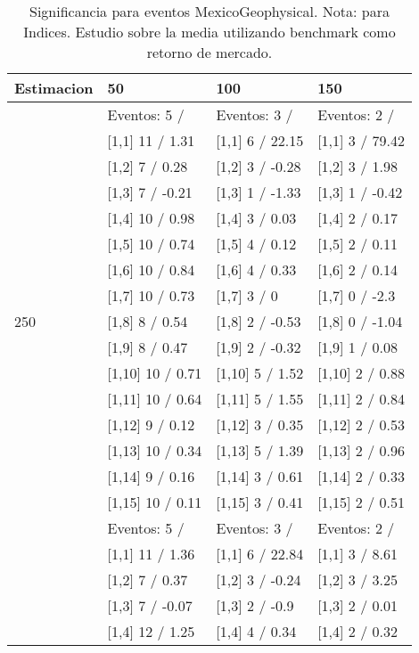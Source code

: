 \begin{table}

\caption{Significancia para eventos MexicoGeophysical. Nota: para Indices. Estudio sobre la media utilizando benchmark como retorno de mercado.}
\centering
\begin{tabular}[t]{llll}
\toprule
Estimacion & 50 & 100 & 150\\
\midrule
 & Eventos:  5 / & Eventos:  3 / & Eventos:  2 /\\
 & {}[1,1] 11  / 1.31 & {}[1,1] 6  / 22.15 & {}[1,1] 3  / 79.42\\
 & {}[1,2] 7  / 0.28 & {}[1,2] 3  / -0.28 & {}[1,2] 3  / 1.98\\
 & {}[1,3] 7  / -0.21 & {}[1,3] 1  / -1.33 & {}[1,3] 1  / -0.42\\
 & {}[1,4] 10  / 0.98 & {}[1,4] 3  / 0.03 & {}[1,4] 2  / 0.17\\
\addlinespace
 & {}[1,5] 10  / 0.74 & {}[1,5] 4  / 0.12 & {}[1,5] 2  / 0.11\\
 & {}[1,6] 10  / 0.84 & {}[1,6] 4  / 0.33 & {}[1,6] 2  / 0.14\\
 & {}[1,7] 10  / 0.73 & {}[1,7] 3  / 0 & {}[1,7] 0  / -2.3\\
250 & {}[1,8] 8  / 0.54 & {}[1,8] 2  / -0.53 & {}[1,8] 0  / -1.04\\
 & {}[1,9] 8  / 0.47 & {}[1,9] 2  / -0.32 & {}[1,9] 1  / 0.08\\
\addlinespace
 & {}[1,10] 10  / 0.71 & {}[1,10] 5  / 1.52 & {}[1,10] 2  / 0.88\\
 & {}[1,11] 10  / 0.64 & {}[1,11] 5  / 1.55 & {}[1,11] 2  / 0.84\\
 & {}[1,12] 9  / 0.12 & {}[1,12] 3  / 0.35 & {}[1,12] 2  / 0.53\\
 & {}[1,13] 10  / 0.34 & {}[1,13] 5  / 1.39 & {}[1,13] 2  / 0.96\\
 & {}[1,14] 9  / 0.16 & {}[1,14] 3  / 0.61 & {}[1,14] 2  / 0.33\\
\addlinespace
 & {}[1,15] 10  / 0.11 & {}[1,15] 3  / 0.41 & {}[1,15] 2  / 0.51\\
 & Eventos:  5 / & Eventos:  3 / & Eventos:  2 /\\
 & {}[1,1] 11  / 1.36 & {}[1,1] 6  / 22.84 & {}[1,1] 3  / 8.61\\
 & {}[1,2] 7  / 0.37 & {}[1,2] 3  / -0.24 & {}[1,2] 3  / 3.25\\
 & {}[1,3] 7  / -0.07 & {}[1,3] 2  / -0.9 & {}[1,3] 2  / 0.01\\
\addlinespace
 & {}[1,4] 12  / 1.25 & {}[1,4] 4  / 0.34 & {}[1,4] 2  / 0.32\\

\end{tabular}
\end{table}
